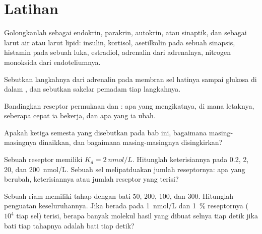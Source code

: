 \section{Latihan}

\begin{exercise}[$\star$]\label{exo:b2:cell-signalling:1}
Golongkanlah sebagai endokrin, parakrin, autokrin, atau sinaptik, dan
sebagai larut air atau larut lipid: insulin, kortisol, asetilkolin pada
sebuah sinapsis, histamin pada sebuah luka, estradiol, adrenalin dari
adrenalnya, nitrogen monoksida dari endoteliumnya.
\end{exercise}

\begin{exercise}[$\star$]\label{exo:b2:cell-signalling:2}
Sebutkan langkahnya dari adrenalin pada membran sel hatinya sampai
glukosa di dalam , dan sebutkan sakelar pemadam tiap
langkahnya.
\end{exercise}

\begin{exercise}[$\star$]\label{exo:b2:cell-signalling:3}
Bandingkan reseptor permukaan dan : apa yang mengikatnya,
di mana letaknya, seberapa cepat ia bekerja, dan apa yang ia ubah.
\end{exercise}

\begin{exercise}[$\star$]\label{exo:b2:cell-signalling:4}
Apakah ketiga  semesta yang disebutkan pada bab ini,
bagaimana masing-masingnya dinaikkan, dan bagaimana masing-masingnya
disingkirkan?
\end{exercise}

\begin{exercise}[$\star\star$]\label{exo:b2:cell-signalling:5}
Sebuah reseptor memiliki $K_d = \qty{2}{nmol/L}$. Hitunglah
keterisiannya pada 0.2, 2, 20, dan \qty{200}{nmol/L}. Sebuah sel
melipatduakan jumlah reseptornya: apa yang berubah, keterisiannya atau
jumlah reseptor yang terisi?
\end{exercise}

\begin{exercise}[$\star\star$]\label{exo:b2:cell-signalling:6}
Sebuah riam memiliki tahap dengan bati 50, 200, 100, dan 300.
Hitunglah penguatan keseluruhannya. Jika  berada pada
\qty{1}{nmol/L} dan \qty{1}{\%} reseptornya ($10^{4}$ tiap sel) terisi,
berapa banyak molekul hasil yang dibuat selnya tiap detik jika bati
tiap tahapnya adalah bati tiap detik?
\end{exercise}

